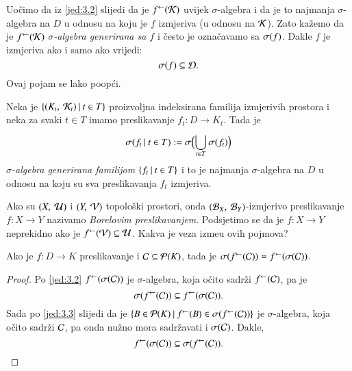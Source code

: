 Uo\v cimo da iz \eqref{jed:3.2} slijedi da je ${f}^{\leftarrow}(\mathcal{K})$ uvijek $\sigma$-algebra i da je to najmanja $\sigma$-algebra na $D$ u odnosu na koju je $f$ izmjeriva (u odnosu na $\mathcal{K}$).
Zato ka\v zemo da je ${f}^{\leftarrow}(\mathcal{K})$ \emph{$\sigma$-algebra generirana sa $f$} i \v cesto je ozna\v cavamo sa \emph{$\sigma({f})$}.
Dakle $f$ je izmjeriva ako i samo ako vrijedi:
\begin{equation*}
    \sigma({f}) \subseteq \mathcal{D}.
\end{equation*}
Ovaj pojam se lako poop\' ci.
\begin{defn}    \label{defn:3.3-1}
    Neka je $\{{(K_t, \: \mathcal{K}_t)} \: | \: {t \in T}\}$ proizvoljna indeksirana familija izmjerivih prostora i neka za svaki $t \in T$ imamo preslikavanje $f_t : D \to K_t$.
    Tada je
    \begin{equation*}
        \sigma({f_t} \: | \: {t \in T}) := \sigma \Big( {\bigcup\limits_{t \in T}^{} \sigma({f_t})} \Big)
    \end{equation*}
    \emph{$\sigma$-algebra generirana familijom $\{{f_t} \: | \: {t \in T}\}$} i to je najmanja $\sigma$-algebra na $D$ u odnosu na koju su sva preslikavanja $f_t$ izmjeriva.
\end{defn}

Ako su $(X, \: \mathcal{U})$ i $(Y, \: \mathcal{V})$ topolo\v ski prostori, onda $(\mathcal{B}_{X}, \: \mathcal{B}_{Y})$-izmjerivo preslikavanje $f: X \to Y$ nazivamo \emph{Borelovim preslikavanjem}.
Podsjetimo se da je $f: X \to Y$ neprekidno ako je ${f}^{\leftarrow}(\mathcal{V}) \subseteq \mathcal{U}$.
Kakva je veza izme\dj u ovih pojmova?

\begin{lm}  \label{lm:3.4}
    Ako je $f: D \to K$ preslikavanje i $\mathcal{C} \subseteq \mathcal{P}({K})$, tada je $\sigma({{f}^{\leftarrow}(\mathcal{C})}) = {f}^{\leftarrow} (\sigma({\mathcal{C}}))$.
\end{lm}

\begin{proof}
    Po \eqref{jed:3.2} ${f}^{\leftarrow}(\sigma({\mathcal{C}}))$ je $\sigma$-algebra, koja o\v cito sadr\v zi ${f}^{\leftarrow}(\mathcal{C})$, pa je
    \begin{equation*}
        \sigma({{f}^{\leftarrow}(\mathcal{C})}) \subseteq {f}^{\leftarrow}(\sigma({\mathcal{C}})).
    \end{equation*}
    Sada po \eqref{jed:3.3} slijedi da je $\{{B \in \mathcal{P}({K})} \: | \: {{f}^{\leftarrow}(B) \in \sigma({{f}^{\leftarrow}(\mathcal{C})})}\}$ je $\sigma$-algebra, koja o\v cito sadr\v zi $\mathcal{C}$, pa onda nu\v zno mora sadr\v zavati i $\sigma({\mathcal{C}})$.
    Dakle,
    \begin{equation*}
        {f}^{\leftarrow}(\sigma({\mathcal{C}})) \subseteq \sigma({{f}^{\leftarrow}(\mathcal{C})}).
    \end{equation*}
\end{proof}

